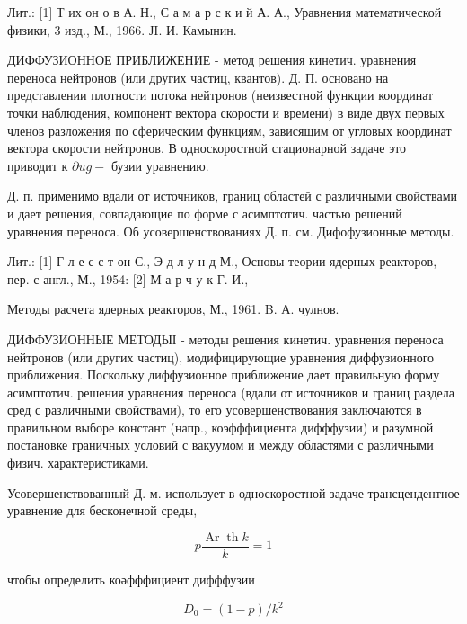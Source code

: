 \documentclass[10pt]{article}
\begin{document}
Лит.: [1] Т их он о в А. Н., С а м а р с к и й А. А., Уравнения математической физики, 3 изд., М., 1966. ЈI. И. Камынин.



ДИФФУЗИОННОЕ ПРИБЛИЖЕНИЕ - метод решения кинетич. уравнения переноса нейтронов (или других частиц, квантов). Д. П. основано на представлении плотности потока нейтронов (неизвестной функции координат точки наблюдения, компонент вектора скорости и времени) в виде двух первых членов разложения по сферическим функциям, зависящим от угловых координат вектора скорости нейтронов. В односкоростной стационарной задаче это приводит к $\partial u g-$ бузии уравнению.



Д. п. применимо вдали от источников, границ областей с различными свойствами и дает решения, совпадающие по форме с асимптотич. частью решений уравнения переноса. Об усовершенствованиях Д. п. см. Дифофузионные методы.



Лит.: [1] Г л е с с т он С., Э д л у н д М., Основы теории ядерных реакторов, пер. с англ., М., 1954: [2] М а р ч у к Г. И.,

Методы расчета ядерных реакторов, М., 1961. B. А. чулнов.



ДИФФУЗИОННЫЕ МЕТОДЫІ - методы решения кинетич. уравнения переноса нейтронов (или других частиц), модифицирующие уравнения диффузионного приближения. Поскольку диффузионное приближение дает правильную форму асимптотич. решения уравнения переноса (вдали от источников и границ раздела сред с различными свойствами), то его усовершенствования заключаются в правильном выборе констант (напр., коэфффициента дифффузии) и разумной постановке граничных условий с вакуумом и между областями с различными физич. характеристиками.



Усовершенствованный Д. м. использует в односкоростной задаче трансцендентное уравнение для бесконечной среды,



\[

p \frac{\operatorname{Ar} \operatorname{th} k}{k}=1

\]



чтобы определить коәфффициент дифффузии



\[

D_{0}=(1-p) / k^{2}

\]
\end{document}
